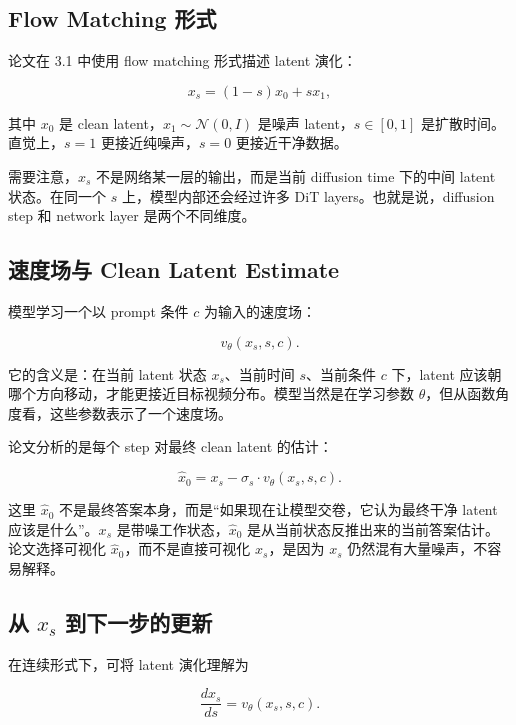 \subsection{Flow Matching 形式}

论文在 3.1 中使用 flow matching 形式描述 latent 演化：

\begin{equation}
    x_s = (1-s)x_0 + sx_1,
\end{equation}

其中 $x_0$ 是 clean latent，$x_1 \sim \mathcal{N}(0,I)$ 是噪声 latent，$s \in [0,1]$ 是扩散时间。直觉上，$s=1$ 更接近纯噪声，$s=0$ 更接近干净数据。

需要注意，$x_s$ 不是网络某一层的输出，而是当前 diffusion time 下的中间 latent 状态。在同一个 $s$ 上，模型内部还会经过许多 DiT layers。也就是说，diffusion step 和 network layer 是两个不同维度。

\subsection{速度场与 Clean Latent Estimate}

模型学习一个以 prompt 条件 $c$ 为输入的速度场：

\begin{equation}
    v_\theta(x_s,s,c).
\end{equation}

它的含义是：在当前 latent 状态 $x_s$、当前时间 $s$、当前条件 $c$ 下，latent 应该朝哪个方向移动，才能更接近目标视频分布。模型当然是在学习参数 $\theta$，但从函数角度看，这些参数表示了一个速度场。

论文分析的是每个 step 对最终 clean latent 的估计：

\begin{equation}
    \hat{x}_0 = x_s - \sigma_s \cdot v_\theta(x_s,s,c).
\end{equation}

这里 $\hat{x}_0$ 不是最终答案本身，而是“如果现在让模型交卷，它认为最终干净 latent 应该是什么”。$x_s$ 是带噪工作状态，$\hat{x}_0$ 是从当前状态反推出来的当前答案估计。论文选择可视化 $\hat{x}_0$，而不是直接可视化 $x_s$，是因为 $x_s$ 仍然混有大量噪声，不容易解释。

\subsection{从 $x_s$ 到下一步的更新}

在连续形式下，可将 latent 演化理解为

\begin{equation}
    \frac{dx_s}{ds} = v_\theta(x_s,s,c).
\end{equation}

